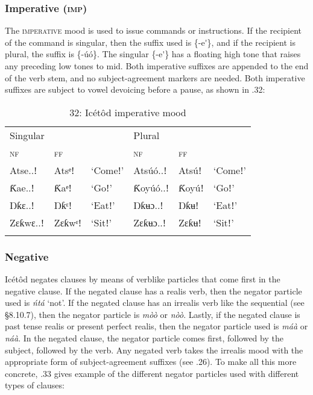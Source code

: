 \begin{table}
\subsubsection{Imperative (\textsc{imp})}

The \textsc{imperative} mood is used to issue commands or instructions. If the recipient of the command is singular, then the suffix used is \{-e\'{ }\}, and if the recipient is plural, the suffix is \{-úó\}. The singular \{-e\'{ }\} has a floating high tone that raises any preceding low tones to mid. Both imperative suffixes are appended to the end of the verb stem, and no subject-agreement markers are needed. Both imperative suffixes are subject to vowel devoicing before a pause, as shown in .32:


\begin{table}
\caption{32: Icétôd imperative mood}
\label{tab:8}


\begin{tabularx}{\textwidth}{XXXXXX}
\lsptoprule

Singular &  &  & Plural &  & \\
\textsc{nf} & \textsc{ff} &  & \textsc{nf} & \textsc{ff} & \\
Atse..ǃ & Atsᵉǃ & ‘Comeǃ’ & Atsúó..ǃ & Atsúǃ & ‘Comeǃ’\\
Ƙae..ǃ & Ƙaᵉǃ & ‘Goǃ’ & Ƙoyúó..ǃ & Ƙoyúǃ & ‘Goǃ’\\
Ŋƙɛ..ǃ & Ŋƙᵋǃ & ‘Eatǃ’ & Ŋƙʉɔ..ǃ & Ŋƙʉǃ & ‘Eatǃ’\\
Zɛƙwɛ..ǃ & Zɛƙwᵋǃ & ‘Sitǃ’ & Zɛƙʉɔ..ǃ & Zɛƙʉǃ & ‘Sitǃ’\\
\lspbottomrule
\end{tabularx}
\end{table}

\subsubsection{Negative}

Icétôd negates clauses by means of verblike particles that come first in the negative clause. If the negated clause has a realis verb, then the negator particle used is \textit{ńtá} ‘not’. If the negated clause has an irrealis verb like the sequential (see §8.10.7), then the negator particle is \textit{mòò }or \textit{nòò}. Lastly, if the negated clause is past tense realis or present perfect realis, then the negator particle used is \textit{máà }or \textit{náà}. In the negated clause, the negator particle comes first, followed by the subject, followed by the verb. Any negated verb takes the irrealis mood with the appropriate form of subject-agreement suffixes (see .26). To make all this more concrete, .33 gives example of the different negator particles used with different types of clauses:



\end{table}
